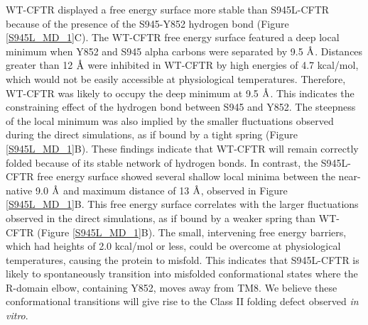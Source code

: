 WT-CFTR displayed a free energy surface more stable than S945L-CFTR because of the presence of the S945-Y852 hydrogen bond (Figure \ref{S945L_MD_1}C). The WT-CFTR free energy surface featured a deep local minimum when Y852 and S945 alpha carbons were separated by 9.5 $\mbox{\textup{\AA}}$. Distances greater than 12 $\mbox{\textup{\AA}}$ were inhibited in WT-CFTR by high energies of 4.7 kcal/mol, which would not be easily accessible at physiological temperatures. Therefore, WT-CFTR was likely to occupy the deep minimum at 9.5 $\mbox{\textup{\AA}}$. This indicates the constraining effect of the hydrogen bond between S945 and Y852. The steepness of the local minimum was also implied by the smaller fluctuations observed during the direct simulations, as if bound by a tight spring (Figure \ref{S945L_MD_1}B). These findings indicate that WT-CFTR will remain correctly folded because of its stable network of hydrogen bonds. In contrast, the S945L-CFTR free energy surface showed several shallow local minima between the near-native 9.0 $\mbox{\textup{\AA}}$ and maximum distance of 13 $\mbox{\textup{\AA}}$, observed in Figure \ref{S945L_MD_1}B. This free energy surface correlates with the larger fluctuations observed in the direct simulations, as if bound by a weaker spring than WT-CFTR (Figure \ref{S945L_MD_1}B). The small, intervening free energy barriers, which had heights of 2.0 kcal/mol or less, could be overcome at physiological temperatures, causing the protein to misfold. This indicates that S945L-CFTR is likely to spontaneously transition into misfolded conformational states where the R-domain elbow, containing Y852, moves away from TM8. We believe these conformational transitions will give rise to the Class II folding defect observed \textit{in vitro}. 

